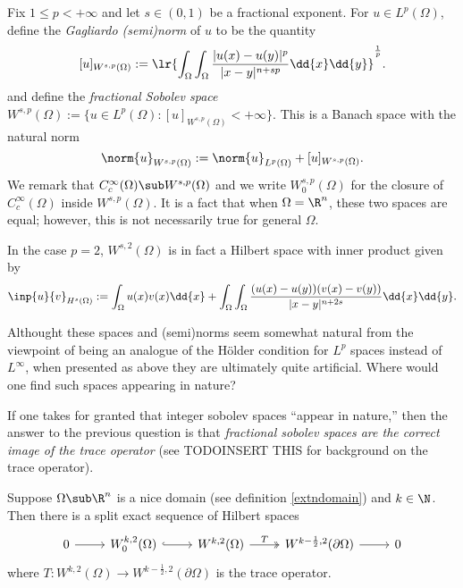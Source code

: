 \documentclass[../main.tex]{subfiles}
\begin{document}
\begin{definition}\label{fracnorms}
    Fix $ 1\leq p <+\infty $ and let $ s\in (0,1) $ be a fractional exponent. For $ u\in L^{p}(\Omega) $, define the \textit{Gagliardo (semi)norm} of $ u $ to be the quantity
    \[
        [u]_{W^{s,p}(\Omega)} := \lr{\int_{\Omega}\int_{\Omega} \frac{|u(x)-u(y)|^{p}}{|x-y|^{n+sp}}\dd{x}\dd{y}}^{\frac{1}{p}}.
    \]
    and define the \textit{fractional Sobolev space} $ W^{s,p}(\Omega):= \{u\in L^{p}(\Omega):[u]_{W^{s,p}(\Omega)}<+\infty\} $. This is a Banach space with the natural norm
    \[
        \norm{u}_{W^{s,p}(\Omega)} := \norm{u}_{L^{p}(\Omega)}+[u]_{W^{s,p}(\Omega)}.
    \]
    We remark that $ C^{\infty}_{c}(\Omega)\sub W^{s,p}(\Omega) $ and we write $ W_{0}^{s,p}(\Omega) $ for the closure of $ C^{\infty}_{c}(\Omega) $ inside $ W^{s,p}(\Omega) $. It is a fact that when $ \Omega = \R^{n} $, these two spaces are equal; however, this is not necessarily true for general $ \Omega $.

    In the case $ p=2 $, $ W^{s,2}(\Omega) $ is in fact a Hilbert space with inner product given by 
    \[
        \inp{u}{v}_{H^{s}(\Omega)} := \int_{\Omega} u(x)v(x)\dd{x} + \int_{\Omega}\int_{\Omega} \frac{(u(x)-u(y))(v(x)-v(y))}{|x-y|^{n+2s}} \dd{x}\dd{y}.
    \]

\end{definition}




Althought these spaces and (semi)norms seem somewhat natural from the viewpoint of being an analogue of the H\"{o}lder condition for $ L^{p} $ spaces instead of $ L^{\infty} $, when presented as above they are ultimately quite artificial. Where would one find such spaces appearing in nature?

If one takes for granted that integer sobolev spaces ``appear in nature,'' then the answer to the previous question is that \textit{fractional sobolev spaces are the correct image of the trace operator} (see TODOINSERT THIS for background on the trace operator).


\begin{proposition}
    Suppose $ \Omega\sub \R^{n} $ is a nice domain (see definition \ref{extndomain}) and $ k\in \N $. Then there is a split exact sequence of Hilbert spaces
\[\begin{tikzcd}
    0 & {W_0^{k,2}(\Omega)} & {W^{k,2}(\Omega)} & {W^{k-\frac{1}{2},2}(\partial\Omega)} & 0
	\arrow[from=1-1, to=1-2]
	\arrow[hook, from=1-2, to=1-3]
	\arrow["T", two heads, from=1-3, to=1-4]
	\arrow[from=1-4, to=1-5]
\end{tikzcd}\]
    where $ T: W^{k,2}(\Omega) \to W^{k-\frac{1}{2},2}(\partial\Omega)$ is the trace operator.
    
\end{proposition}
\end{document}
